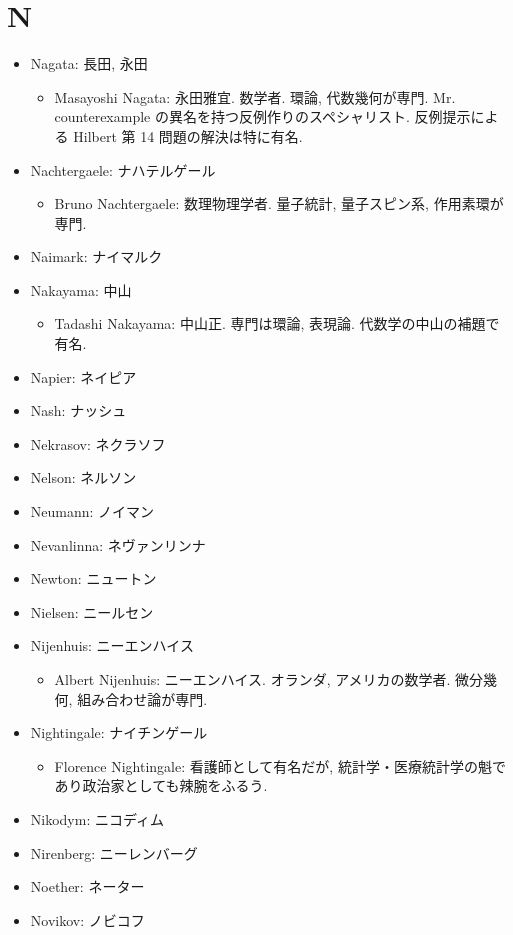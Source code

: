 \documentclass[openany, a4paper, oneside]{jsbook}
\begin{document}
\section{N}

\begin{itemize}
\item Nagata: 長田, 永田
\begin{itemize}
\item Masayoshi Nagata: 永田雅宜. 数学者. 環論, 代数幾何が専門. Mr. counterexample の異名を持つ反例作りのスペシャリスト. 反例提示による Hilbert 第 14 問題の解決は特に有名.
\end{itemize}
\item Nachtergaele: ナハテルゲール
\begin{itemize}
\item Bruno Nachtergaele: 数理物理学者. 量子統計, 量子スピン系, 作用素環が専門.
\end{itemize}
\item Naimark: ナイマルク
\item Nakayama: 中山
\begin{itemize}
\item Tadashi Nakayama: 中山正. 専門は環論, 表現論. 代数学の中山の補題で有名.
\end{itemize}
\item Napier: ネイピア
\item Nash: ナッシュ
\item Nekrasov: ネクラソフ
\item Nelson: ネルソン
\item Neumann: ノイマン
\item Nevanlinna: ネヴァンリンナ
\item Newton: ニュートン
\item Nielsen: ニールセン
\item Nijenhuis: ニーエンハイス
\begin{itemize}
\item Albert Nijenhuis: ニーエンハイス. オランダ, アメリカの数学者. 微分幾何, 組み合わせ論が専門.
\end{itemize}
\item Nightingale: ナイチンゲール
\begin{itemize}
\item Florence Nightingale: 看護師として有名だが, 統計学・医療統計学の魁であり政治家としても辣腕をふるう.
\end{itemize}
\item Nikodym: ニコディム
\item Nirenberg: ニーレンバーグ
\item Noether: ネーター
\item Novikov: ノビコフ
\end{itemize}
\end{document}
